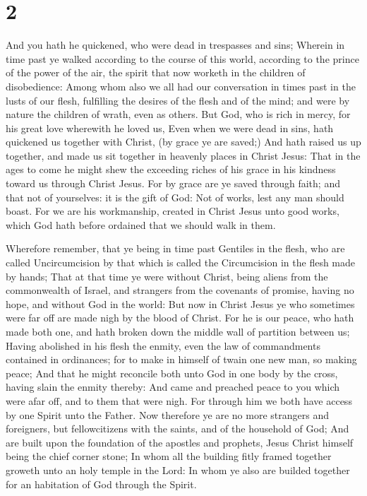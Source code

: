 \hypertarget{section-1}{%
\section{2}\label{section-1}}

 And you hath he quickened, who were dead in trespasses and
sins;  Wherein in time past ye walked according to the
course of this world, according to the prince of the power of the air,
the spirit that now worketh in the children of disobedience:
 Among whom also we all had our conversation in times past
in the lusts of our flesh, fulfilling the desires of the flesh and of
the mind; and were by nature the children of wrath, even as others.
 But God, who is rich in mercy, for his great love wherewith
he loved us,  Even when we were dead in sins, hath quickened
us together with Christ, (by grace ye are saved;)  And hath
raised us up together, and made us sit together in heavenly places in
Christ Jesus:  That in the ages to come he might shew the
exceeding riches of his grace in his kindness toward us through Christ
Jesus.  For by grace are ye saved through faith; and that
not of yourselves: it is the gift of God:  Not of works,
lest any man should boast.  For we are his workmanship,
created in Christ Jesus unto good works, which God hath before ordained
that we should walk in them.

 Wherefore remember, that ye being in time past Gentiles in
the flesh, who are called Uncircumcision by that which is called the
Circumcision in the flesh made by hands;  That at that time
ye were without Christ, being aliens from the commonwealth of Israel,
and strangers from the covenants of promise, having no hope, and without
God in the world:  But now in Christ Jesus ye who sometimes
were far off are made nigh by the blood of Christ.  For he
is our peace, who hath made both one, and hath broken down the middle
wall of partition between us;  Having abolished in his
flesh the enmity, even the law of commandments contained in ordinances;
for to make in himself of twain one new man, so making peace;
 And that he might reconcile both unto God in one body by
the cross, having slain the enmity thereby:  And came and
preached peace to you which were afar off, and to them that were nigh.
 For through him we both have access by one Spirit unto the
Father.  Now therefore ye are no more strangers and
foreigners, but fellowcitizens with the saints, and of the household of
God;  And are built upon the foundation of the apostles and
prophets, Jesus Christ himself being the chief corner stone;
 In whom all the building fitly framed together groweth
unto an holy temple in the Lord:  In whom ye also are
builded together for an habitation of God through the Spirit.

